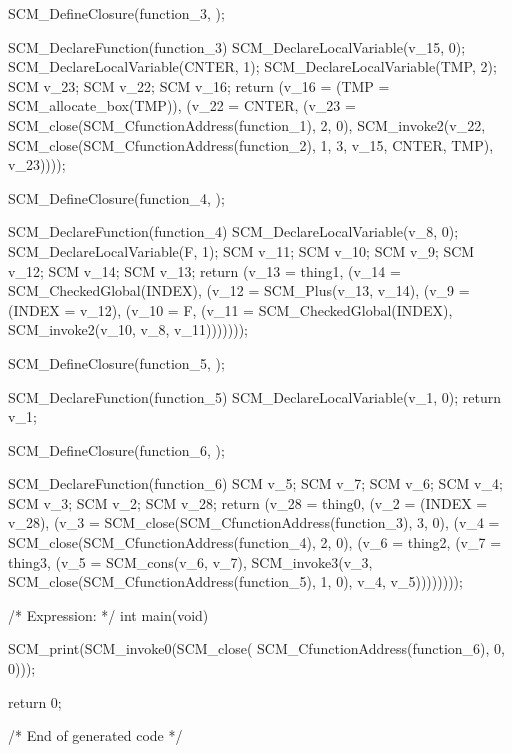 \begin{code:c-frame}[title={\snippet{o/chap10kex.c}}, numbers=left,
    label=cc/call/cc/cc/example/src:subj]
SCM_DefineClosure(function_3, );

SCM_DeclareFunction(function_3)
{
    SCM_DeclareLocalVariable(v_15, 0);
    SCM_DeclareLocalVariable(CNTER, 1);
    SCM_DeclareLocalVariable(TMP, 2);
    SCM v_23; SCM v_22; SCM v_16;
    return (v_16 = (TMP = SCM_allocate_box(TMP)),
            (v_22 = CNTER,
             (v_23 = SCM_close(SCM_CfunctionAddress(function_1), 2, 0),
              SCM_invoke2(v_22,
                          SCM_close(SCM_CfunctionAddress(function_2),
                                    1, 3, v_15, CNTER, TMP),
                          v_23))));
}

SCM_DefineClosure(function_4, );

SCM_DeclareFunction(function_4)
{
    SCM_DeclareLocalVariable(v_8, 0);
    SCM_DeclareLocalVariable(F, 1);
    SCM v_11; SCM v_10; SCM v_9; SCM v_12; SCM v_14; SCM v_13;
    return (v_13 = thing1,
            (v_14 = SCM_CheckedGlobal(INDEX),
             (v_12 = SCM_Plus(v_13, v_14),
              (v_9 = (INDEX = v_12),
               (v_10 = F,
                (v_11 = SCM_CheckedGlobal(INDEX),
                 SCM_invoke2(v_10,
                             v_8,
                             v_11)))))));
}

SCM_DefineClosure(function_5, );

SCM_DeclareFunction(function_5)
{
    SCM_DeclareLocalVariable(v_1, 0);
    return v_1;
}

SCM_DefineClosure(function_6, );

SCM_DeclareFunction(function_6)
{
    SCM v_5; SCM v_7; SCM v_6; SCM v_4; SCM v_3; SCM v_2; SCM v_28;
    return (v_28 = thing0,
            (v_2 = (INDEX = v_28),
             (v_3 = SCM_close(SCM_CfunctionAddress(function_3), 3, 0),
              (v_4 = SCM_close(SCM_CfunctionAddress(function_4), 2, 0),
               (v_6 = thing2,
                (v_7 = thing3,
                 (v_5 = SCM_cons(v_6, v_7),
                  SCM_invoke3(v_3,
                              SCM_close(SCM_CfunctionAddress(function_5),
                                        1, 0),
                              v_4,
                              v_5))))))));
}

/* Expression: */
int main(void)
{
    SCM_print(SCM_invoke0(SCM_close(
        SCM_CfunctionAddress(function_6), 0, 0)));

    return 0;
}

/* End of generated code */
\end{code:c-frame}

